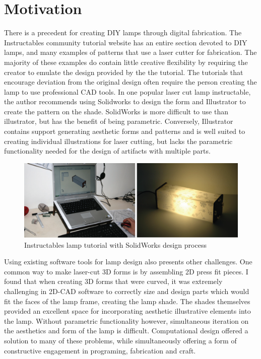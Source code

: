 \section{Motivation}
There is a precedent for creating DIY lamps through digital fabrication. The Instructables community tutorial website has an entire section devoted to DIY lamps, and many examples of patterns that use a laser cutter for fabrication. The majority of these examples do contain little creative flexibility by requiring the creator to emulate the design provided by the the tutorial. The tutorials that encourage deviation from the original design often require the person creating the lamp to use professional CAD tools. In one popular laser cut lamp instructable, the author recommends using Solidworks to design the form and Illustrator to create the pattern on the shade\cite{instructables_lamp}. SolidWorks is more difficult to use than illustrator, but has the benefit of being parametric. Conversely, Illustrator contains support generating aesthetic forms and patterns and is well suited to creating individual illustrations for laser cutting, but lacks the parametric functionality needed for the design of artifacts with multiple parts.
\begin{center}
\begin{figure}[h!]
\includegraphics[width=6.5in]{images/solidworks_lamp.png}
\caption{Instructables lamp tutorial with SolidWorks design process}
\end{figure}
\end{center}
Using existing software tools for lamp design also presents other challenges. One common way to make laser-cut 3D forms is by assembling 2D press fit pieces. I found that when creating 3D forms that were curved, it was extremely challenging in 2D-CAD software to correctly size and design parts which would fit the faces of the lamp frame, creating the lamp shade. The shades themselves provided an excellent space for incorporating aesthetic illustrative elements into the lamp. Without parametric functionality however, simultaneous iteration on the aesthetics and form of the lamp is difficult. Computational design offered a solution to many of these problems, while simultaneously offering a form of constructive engagement in programing, fabrication and craft.

